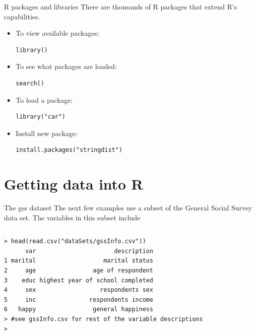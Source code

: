 \documentclass[table,smaller]{beamer}
\begin{document}
\begin{frame}[fragile,label=sec-4-2]{R packages and libraries}
 There are thousands of R packages that extend R's capabilities.

\begin{itemize}
\item To view available packages: 
\begin{verbatim}
library()
\end{verbatim}

\item To see what packages are loaded: 
\begin{verbatim}
search()
\end{verbatim}

\item To load a package: 
\begin{verbatim}
library("car")
\end{verbatim}

\item Install new package: 
\begin{verbatim}
install.packages("stringdist")
\end{verbatim}
\end{itemize}
\end{frame}


\section{Getting data into R}
\label{sec-5}


\begin{frame}[fragile,label=sec-5-1]{The gss dataset}
 The next few examples use a subset of the General Social Survey data set. The variables in this subset include
\vspace{-.5em}
\begin{columns}
\begin{block}{}
\begin{verbatim}
> head(read.csv("dataSets/gssInfo.csv")) 
      var                      description
1 marital                   marital status
2     age                age of respondent
3    educ highest year of school completed
4     sex                  respondents sex
5     inc               respondents income
6   happy                general happiness
> #see gssInfo.csv for rest of the variable descriptions
>
\end{verbatim}
\end{block}
\end{columns}
\vspace{.5em}
\end{frame}
\end{document}
